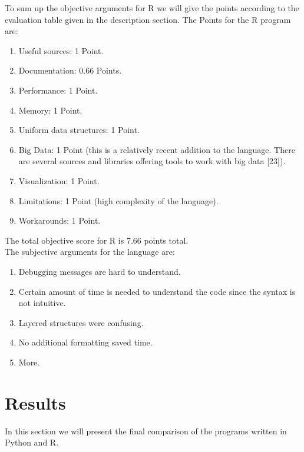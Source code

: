 \documentclass [twoside,
  11pt, a4paper,
  footinclude=true,
  headinclude=true,
  cleardoublepage=empty
]{article}
\begin{document}
To sum up the objective arguments for R we will give the points according to the evaluation table given in the description section. The Points for the R program are:
\begin{enumerate}
    \item Useful sources: 1 Point.
    \item Documentation: 0.66 Points.
    \item Performance: 1 Point.
    \item Memory: 1 Point.
    \item Uniform data structures: 1 Point.
    \item Big Data: 1 Point (this is a relatively recent addition to the language. There are several sources and libraries offering tools to work with big data [23]).
    \item Visualization: 1 Point.
    \item Limitations: 1 Point (high complexity of the language).
    \item Workarounds: 1 Point.
\end{enumerate} 
The total objective score for R is 7.66 points total.\\
The subjective arguments for the language are:
\begin{enumerate}
    \item Debugging messages are hard to understand.
    \item Certain amount of time is needed to understand the code since the syntax is not intuitive.
    \item Layered structures were confusing.
    \item No additional formatting saved time.
    \item More.
\end{enumerate}

\newpage
\section{Results}
In this section we will present the final comparison of the programs written in Python and R.
\end{document}
